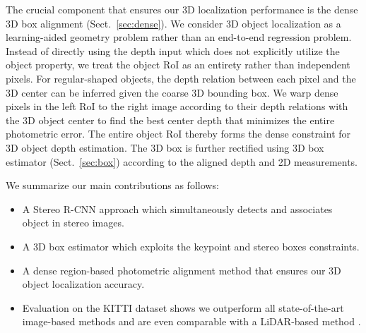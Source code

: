 \documentclass[10pt,twocolumn,letterpaper]{article}
\begin{document}
	The crucial component that ensures our 3D localization performance is the dense 3D box alignment (Sect.~\ref{sec:dense}). We consider 3D object localization as a learning-aided geometry problem rather than an end-to-end regression problem. Instead of directly using the depth input \cite{3dopJournal,cvpr18xu} which does not explicitly utilize the object property, we treat the object RoI as an entirety rather than independent pixels. For regular-shaped objects, the depth relation between each pixel and the 3D center can be inferred given the coarse 3D bounding box. We warp dense pixels in the left RoI to the right image according to their depth relations with the 3D object center to find the best center depth that minimizes the entire photometric error. The entire object RoI thereby forms the dense constraint for 3D object depth estimation. 
	The 3D box is further rectified using 3D box estimator (Sect.~\ref{sec:box}) according to the aligned depth and 2D measurements.


	We summarize our main contributions as follows:
	\begin{itemize}
		\item A Stereo R-CNN approach which simultaneously detects and associates object in stereo images.
		\item A 3D box estimator which exploits the keypoint and stereo boxes constraints.
		\item A dense region-based photometric alignment method that ensures our 3D object localization accuracy.
		\item Evaluation on the KITTI dataset shows we outperform all state-of-the-art image-based methods and are even comparable with a LiDAR-based method \cite{li2016vehicle}. 
	\end{itemize}
	
\end{document}
